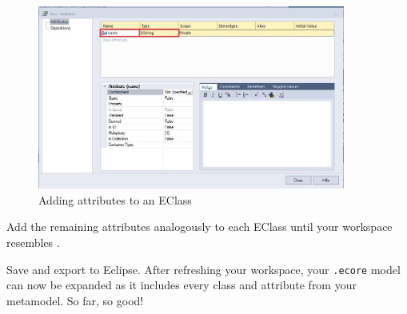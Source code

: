 \begin{stepbystep}
\vspace{1.0cm}

\begin{figure}[htbp]
	\centering
  \includegraphics[width=0.9\textwidth]{../../org.moflon.doc.handbook.02_leitnersLearningBox/2_staticSemantics/2_definingClasses/dcVisImages/ea_addAttributesDialogue}
	\caption{Adding attributes to an EClass}
	\label{ea:attribute_properties}
\end{figure}

\vspace{0.5cm}

\item Add the remaining attributes analogously to each EClass until your workspace resembles .

\vspace{0.5cm}

\item Save and export to Eclipse. After refreshing your workspace, your \texttt{.ecore} model can now be expanded as it includes
every class and attribute from your metamodel. So far, so good!

\newpage

\vspace*{3cm}


\end{stepbystep}
